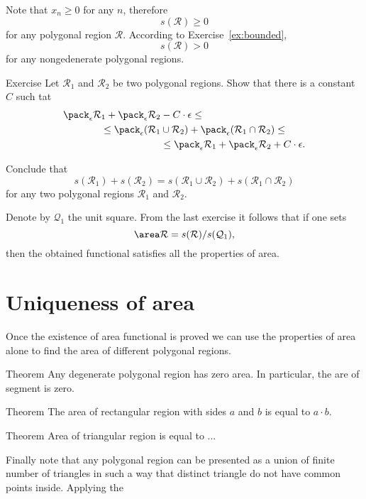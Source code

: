 {Note that $x_n\ge 0$ for any $n$, therefore 
$$s(\mathcal R)\ge 0$$
for any polygonal region $\mathcal R$.
According to Exercise~\ref{ex:bounded},
$$s(\mathcal R)> 0$$
for any nongedenerate polygonal regions.


\begin{thm}{Exercise}
Let $\mathcal R_1$ and $\mathcal R_2$ be  two polygonal regions.
Show that there is a constant $C$ such tat
\begin{align*}
\pack_\epsilon \mathcal R_1 +\pack_\epsilon\mathcal R_2 &-C\cdot\epsilon\le
\\
\le
\pack_\epsilon (\mathcal R_1&\cup\mathcal R_2) +\pack_\epsilon (\mathcal R_1\cap\mathcal R_2)
\le 
\\
&\le
\pack_\epsilon \mathcal R_1 +\pack_\epsilon\mathcal R_2 +C\cdot\epsilon.
\end{align*}

Conclude that 
$$s(\mathcal{R}_1)+s (\mathcal{R}_2)=s(\mathcal{R}_1\cup\mathcal{R}_2)+s(\mathcal{R}_1\cap\mathcal{R}_2)$$
for any two polygonal regions $\mathcal R_1$ and $\mathcal R_2$.
\end{thm}

Denote by $\mathcal{Q}_1$ the unit square.
From the last exercise it follows that if one sets
$$\area\mathcal{R}=s(\mathcal{R})/s(\mathcal{Q}_1),$$
then the obtained functional satisfies all the properties of area.

\section*{Uniqueness of area}

Once the existence of area functional is proved we can use the properties of area alone to find the area of different polygonal regions.

\begin{thm}{Theorem}
Any degenerate polygonal region has zero area.
In particular, the are of segment is zero.
\end{thm}


\begin{thm}{Theorem}
The area of rectangular region with sides $a$ and $b$ is equal to $a\cdot b$. 
\end{thm}


\begin{thm}{Theorem}
Area of triangular region is equal to ...
\end{thm}

Finally note that any polygonal region can be presented as a union of finite number of triangles in such a way that distinct triangle do not have common points inside.
Applying the 

}
